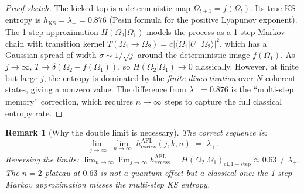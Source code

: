 \documentclass[12pt,a4paper]{article}
\newtheorem{remark}[theorem]{Remark}
\begin{document}
\begin{proof}[Proof sketch]
  The kicked top is a deterministic map $\Omega_{t+1} = f(\Omega_t)$.
  Its true KS entropy is $h_{\mathrm{KS}} = \lambda_+ = 0.876$ (Pesin
  formula for the positive Lyapunov exponent).  The 1-step approximation
  $H(\Omega_2|\Omega_1)$ models the process as a 1-step Markov chain
  with transition kernel $T(\Omega_1 \to \Omega_2)
  = c|\langle\Omega_1|U^\dagger|\Omega_2\rangle|^2$, which has a Gaussian
  spread of width $\sigma \sim 1/\sqrt{j}$ around the deterministic image
  $f(\Omega_1)$.  As $j \to \infty$, $T \to \delta(\Omega_2 - f(\Omega_1))$,
  so $H(\Omega_2|\Omega_1) \to 0$ classically.  However, at finite but
  large $j$, the entropy is dominated by the \emph{finite discretization}
  over $N$ coherent states, giving a nonzero value.  The difference from
  $\lambda_+ = 0.876$ is the ``multi-step memory'' correction, which requires
  $n \to \infty$ steps to capture the full classical entropy rate.
\end{proof}

\begin{remark}[Why the double limit is necessary]
  \label{rem:double_limit}
  The correct sequence is:
  \begin{equation}
    \lim_{j \to \infty}\;\lim_{n \to \infty}\;
    h_{\mathrm{excess}}^{\mathrm{AFL}}(j, k, n)
    \;=\; \lambda_+.
  \end{equation}
  Reversing the limits:
  $\lim_{n \to \infty}\lim_{j \to \infty}h_{\mathrm{excess}}^{\mathrm{AFL}}
  = H(\Omega_2|\Omega_1)_{\mathrm{cl,1-step}} \approx 0.63 \neq \lambda_+$.
  The $n=2$ plateau at $0.63$ is not a quantum effect but a classical one:
  the 1-step Markov approximation misses the multi-step KS entropy.
\end{remark}
\end{document}
